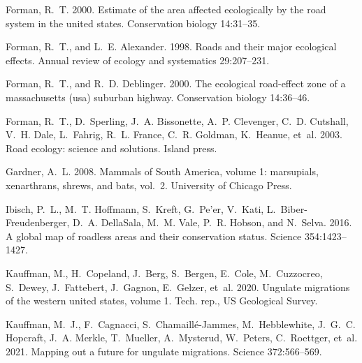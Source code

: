 \documentclass[11pt]{article}
\begin{document}
\begin{thebibliography}{40}
Forman, R.~T. 2000.
\newblock Estimate of the area affected ecologically by the road system in the
  united states.
\newblock Conservation biology 14:31--35.

Forman, R.~T., and L.~E. Alexander. 1998.
\newblock Roads and their major ecological effects.
\newblock Annual review of ecology and systematics 29:207--231.

Forman, R.~T., and R.~D. Deblinger. 2000.
\newblock The ecological road-effect zone of a massachusetts (usa) suburban
  highway.
\newblock Conservation biology 14:36--46.

Forman, R.~T., D.~Sperling, J.~A. Bissonette, A.~P. Clevenger, C.~D. Cutshall,
  V.~H. Dale, L.~Fahrig, R.~L. France, C.~R. Goldman, K.~Heanue, et~al. 2003.
\newblock Road ecology: science and solutions.
\newblock Island press.

Gardner, A.~L. 2008.
\newblock Mammals of South America, volume 1: marsupials, xenarthrans, shrews,
  and bats, vol.~2.
\newblock University of Chicago Press.

Ibisch, P.~L., M.~T. Hoffmann, S.~Kreft, G.~Pe'er, V.~Kati,
  L.~Biber-Freudenberger, D.~A. DellaSala, M.~M. Vale, P.~R. Hobson, and
  N.~Selva. 2016.
\newblock A global map of roadless areas and their conservation status.
\newblock Science 354:1423--1427.

Kauffman, M., H.~Copeland, J.~Berg, S.~Bergen, E.~Cole, M.~Cuzzocreo, S.~Dewey,
  J.~Fattebert, J.~Gagnon, E.~Gelzer, et~al. 2020.
\newblock Ungulate migrations of the western united states, volume 1.
\newblock Tech. rep., US Geological Survey.

Kauffman, M.~J., F.~Cagnacci, S.~Chamaill{\'e}-Jammes, M.~Hebblewhite, J.~G.~C.
  Hopcraft, J.~A. Merkle, T.~Mueller, A.~Mysterud, W.~Peters, C.~Roettger,
  et~al. 2021.
\newblock Mapping out a future for ungulate migrations.
\newblock Science 372:566--569.


\end{thebibliography}
\end{document}
